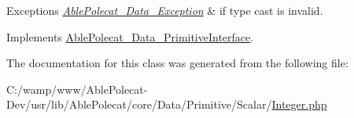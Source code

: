 \begin{DoxyExceptions}{Exceptions}
{\em \hyperlink{class_able_polecat___data___exception}{Able\+Polecat\+\_\+\+Data\+\_\+\+Exception}} & if type cast is invalid. \\
\hline
\end{DoxyExceptions}


Implements \hyperlink{interface_able_polecat___data___primitive_interface_a68640750b79d1cdda3cddcece68a207e}{Able\+Polecat\+\_\+\+Data\+\_\+\+Primitive\+Interface}.



The documentation for this class was generated from the following file\+:\begin{DoxyCompactItemize}
\item 
C\+:/wamp/www/\+Able\+Polecat-\/\+Dev/usr/lib/\+Able\+Polecat/core/\+Data/\+Primitive/\+Scalar/\hyperlink{_integer_8php}{Integer.\+php}\end{DoxyCompactItemize}
